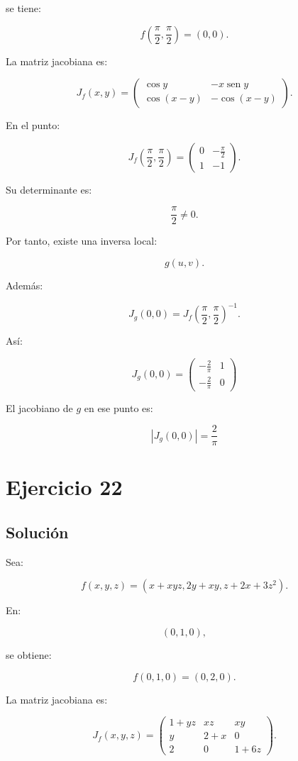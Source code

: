 \documentclass[11pt,a4paper]{article}
\newcommand{\sen}{\operatorname{sen}}
\begin{document}
se tiene:

\[
f\left(
\frac{\pi}{2},
\frac{\pi}{2}
\right)
=
(0,0).
\]

La matriz jacobiana es:

\[
J_f(x,y)
=
\begin{pmatrix}
\cos y&-x\sen y\\
\cos(x-y)&-\cos(x-y)
\end{pmatrix}.
\]

En el punto:

\[
J_f\left(
\frac{\pi}{2},
\frac{\pi}{2}
\right)
=
\begin{pmatrix}
0&-\frac{\pi}{2}\\
1&-1
\end{pmatrix}.
\]

Su determinante es:

\[
\frac{\pi}{2}\neq0.
\]

Por tanto, existe una inversa local:

\[
g(u,v).
\]

Además:

\[
J_g(0,0)
=
J_f\left(
\frac{\pi}{2},
\frac{\pi}{2}
\right)^{-1}.
\]

Así:

\[
\boxed{
J_g(0,0)
=
\begin{pmatrix}
-\frac2\pi&1\\[1mm]
-\frac2\pi&0
\end{pmatrix}
}
\]

El jacobiano de \(g\) en ese punto es:

\[
\boxed{
|J_g(0,0)|
=
\frac2\pi
}
\]

\section{Ejercicio 22}
\subsection{Solución}

Sea:

\[
f(x,y,z)
=
\left(
x+xyz,
2y+xy,
z+2x+3z^2
\right).
\]

En:

\[
(0,1,0),
\]

se obtiene:

\[
f(0,1,0)
=
(0,2,0).
\]

La matriz jacobiana es:

\[
J_f(x,y,z)
=
\begin{pmatrix}
1+yz&xz&xy\\
y&2+x&0\\
2&0&1+6z
\end{pmatrix}.
\]
\end{document}
